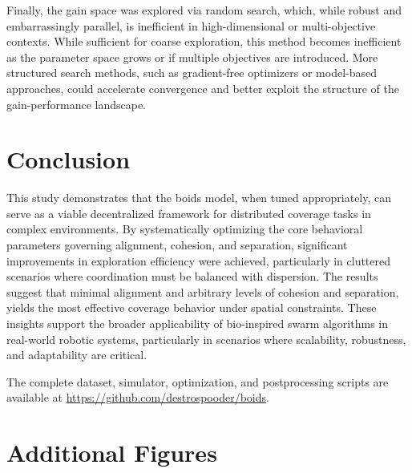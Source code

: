 \documentclass[12pt]{article}
\begin{document}
Finally, the gain space was explored via random search, which, while robust and embarrassingly parallel, is inefficient in high-dimensional or multi-objective contexts. While sufficient for coarse exploration, this method becomes inefficient as the parameter space grows or if multiple objectives are introduced. More structured search methods, such as gradient-free optimizers or model-based approaches, could accelerate convergence and better exploit the structure of the gain-performance landscape.

\section{Conclusion}

This study demonstrates that the boids model, when tuned appropriately, can serve as a viable decentralized framework for distributed coverage tasks in complex environments. By systematically optimizing the core behavioral parameters governing alignment, cohesion, and separation, significant improvements in exploration efficiency were achieved, particularly in cluttered scenarios where coordination must be balanced with dispersion. The results suggest that minimal alignment and arbitrary levels of cohesion and separation, yields the most effective coverage behavior under spatial constraints. These insights support the broader applicability of bio-inspired swarm algorithms in real-world robotic systems, particularly in scenarios where scalability, robustness, and adaptability are critical.

The complete dataset, simulator, optimization, and postprocessing scripts are available at \url{https://github.com/destrospooder/boids}.



\newpage

\appendix

\appendix
\section{Additional Figures}
\end{document}
